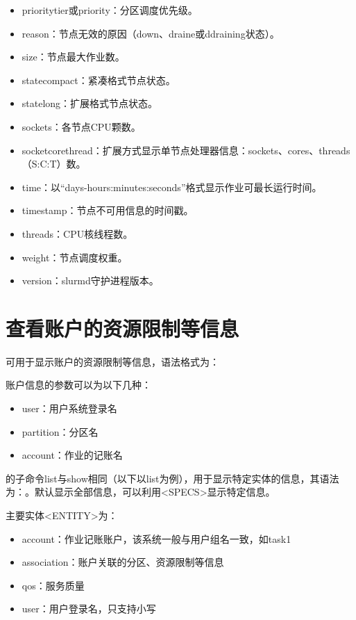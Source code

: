 \begin{itemize}
\begin{itemize}
\begin{itemize}
   	\item prioritytier或priority：分区调度优先级。
   	\item reason：节点无效的原因（down、draine或ddraining状态）。
   	\item size：节点最大作业数。
   	\item statecompact：紧凑格式节点状态。
   	\item statelong：扩展格式节点状态。
   	\item sockets：各节点CPU颗数。
   	\item socketcorethread：扩展方式显示单节点处理器信息：sockets、cores、threads（S:C:T）数。
   	\item time：以``days-hours:minutes:seconds''格式显示作业可最长运行时间。
   	\item timestamp：节点不可用信息的时间戳。
   	\item threads：CPU核线程数。
   	\item weight：节点调度权重。
   	\item version：slurmd守护进程版本。
\end{itemize}
\end{itemize}
\end{itemize}

\section{查看账户的资源限制等信息}
可用于显示账户的资源限制等信息，语法格式为：

账户信息的参数可以为以下几种：
\begin{itemize}
   \item user：用户系统登录名
   \item partition：分区名
   \item account：作业的记账名
\end{itemize}

的子命令list与show相同（以下以list为例），用于显示特定实体的信息，其语法为：。默认显示全部信息，可以利用<SPECS>显示特定信息。

主要实体<ENTITY>为：
\begin{itemize}
	\item account：作业记账账户，该系统一般与用户组名一致，如task1
	\item association：账户关联的分区、资源限制等信息
	\item qos：服务质量
	\item user：用户登录名，只支持小写
\end{itemize}

